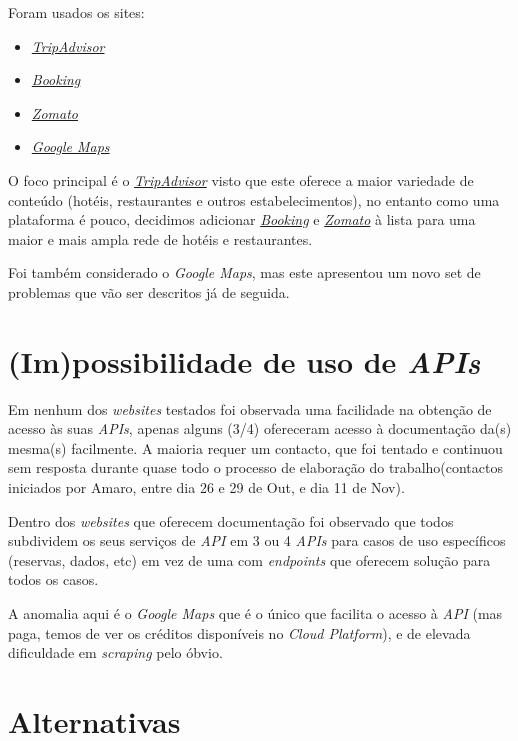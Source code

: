 Foram usados os sites:
\begin{itemize}
  \item \textit{\href{https://www.tripadvisor.com/}{TripAdvisor}}
  \item \textit{\href{https://www.booking.com/}{Booking}}
  \item \textit{\href{https://www.zomato.com/}{Zomato}}
  \item \textit{\href{https://developers.google.com/maps}{Google Maps}}
\end{itemize}

O foco principal é o \textit{\href{https://www.tripadvisor.com/}{TripAdvisor}} visto que este oferece a maior variedade de conteúdo (hotéis, restaurantes e outros estabelecimentos), no entanto como uma plataforma é pouco, decidimos adicionar \textit{\href{https://www.booking.com/}{Booking}} e \textit{\href{https://www.zomato.com/}{Zomato}} à lista para uma maior e mais ampla rede de hotéis e restaurantes.

Foi também considerado o \textit{Google Maps}, mas este apresentou um novo set de problemas que vão ser descritos já de seguida.

\section{(Im)possibilidade de uso de \textit{APIs}}

Em nenhum dos \textit{websites} testados foi observada uma facilidade na obtenção de acesso às suas \textit{APIs}, apenas alguns (3/4) ofereceram acesso à documentação da(s) mesma(s) facilmente. A maioria requer um contacto, que foi tentado e continuou sem resposta durante quase todo o processo de elaboração do trabalho(contactos iniciados por Amaro, entre dia 26 e 29 de Out, e dia 11 de Nov).

Dentro dos \textit{websites} que oferecem documentação foi observado que todos subdividem os seus serviços de \textit{API} em 3 ou 4 \textit{APIs} para casos de uso específicos (reservas, dados, etc) em vez de uma com \textit{endpoints} que oferecem solução para todos os casos.

A anomalia aqui é o \textit{Google Maps} que é o único que facilita o acesso à \textit{API} (mas paga, temos de ver os créditos disponíveis no \textit{Cloud Platform}), e de elevada dificuldade em \textit{scraping} pelo óbvio.

\section{Alternativas}

